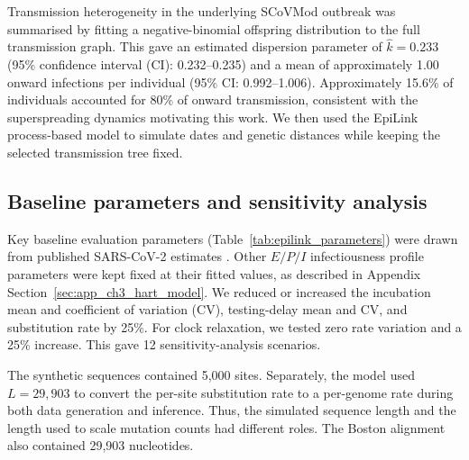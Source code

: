 Transmission heterogeneity in the underlying SCoVMod outbreak was summarised by fitting a negative-binomial offspring distribution to the full transmission graph. This gave an estimated dispersion parameter of $\hat{k}=0.233$ (95\% confidence interval (CI): 0.232--0.235) and a mean of approximately 1.00 onward infections per individual (95\% CI: 0.992--1.006). Approximately 15.6\% of individuals accounted for 80\% of onward transmission, consistent with the superspreading dynamics motivating this work. We then used the EpiLink process-based model to simulate dates and genetic distances while keeping the selected transmission tree fixed. %

\subsection{Baseline parameters and sensitivity analysis}\label{sec:ch3_parameters_sensitivity}

Key baseline evaluation parameters (Table~\ref{tab:epilink_parameters}) were drawn from published SARS-CoV-2 estimates \citep{Hart2021,Duchene2020,vanDorp2020}. Other $E/P/I$ infectiousness profile parameters were kept fixed at their fitted values, as described in Appendix Section~\ref{sec:app_ch3_hart_model}. We reduced or increased the incubation mean and coefficient of variation (CV), testing-delay mean and CV, and substitution rate by 25\%. For clock relaxation, we tested zero rate variation and a 25\% increase. This gave 12 sensitivity-analysis scenarios.

The synthetic sequences contained 5,000 sites. Separately, the model used $L=29{,}903$ to convert the per-site substitution rate to a per-genome rate during both data generation and inference. Thus, the simulated sequence length and the length used to scale mutation counts had different roles. The Boston alignment also contained 29,903 nucleotides.

